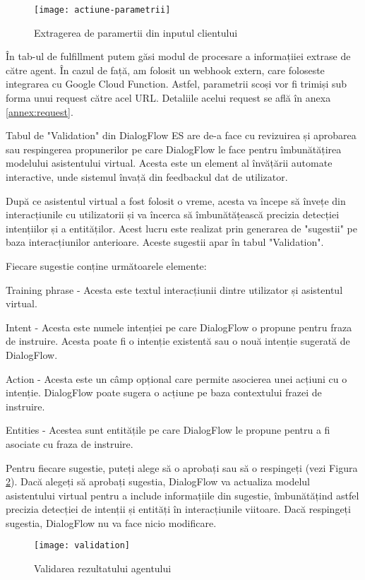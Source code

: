 \begin{figure}[h]
    \centering
    \texttt{[image: actiune-parametrii]}
    \caption{Extragerea de paramertii din inputul clientului}
    \label{fig:actiune-parametrii}
\end{figure}

În tab-ul de fulfillment putem găsi modul de procesare a informațiiei extrase de către agent. În cazul de față, am folosit un webhook extern, care foloseste integrarea cu Google Cloud Function. Astfel, parametrii scoși vor fi trimiși sub forma unui request către acel URL. Detaliile acelui request se află în anexa \ref{annex:request}.

Tabul de "Validation" din DialogFlow ES are de-a face cu revizuirea și aprobarea sau respingerea propunerilor pe care DialogFlow le face pentru îmbunătățirea modelului asistentului virtual. Acesta este un element al învățării automate interactive, unde sistemul învață din feedbackul dat de utilizator.

După ce asistentul virtual a fost folosit o vreme, acesta va începe să învețe din interacțiunile cu utilizatorii și va încerca să îmbunătățească precizia detecției intențiilor și a entităților. Acest lucru este realizat prin generarea de "sugestii" pe baza interacțiunilor anterioare. Aceste sugestii apar în tabul "Validation".

Fiecare sugestie conține următoarele elemente:

Training phrase - Acesta este textul interacțiunii dintre utilizator și asistentul virtual.

Intent - Acesta este numele intenției pe care DialogFlow o propune pentru fraza de instruire. Acesta poate fi o intenție existentă sau o nouă intenție sugerată de DialogFlow.

Action - Acesta este un câmp opțional care permite asocierea unei acțiuni cu o intenție. DialogFlow poate sugera o acțiune pe baza contextului frazei de instruire.

Entities - Acestea sunt entitățile pe care DialogFlow le propune pentru a fi asociate cu fraza de instruire.

Pentru fiecare sugestie, puteți alege să o aprobați sau să o respingeți (vezi Figura \ref{fig:validation}). Dacă alegeți să aprobați sugestia, DialogFlow va actualiza modelul asistentului virtual pentru a include informațiile din sugestie, îmbunătățind astfel precizia detecției de intenții și entități în interacțiunile viitoare. Dacă respingeți sugestia, DialogFlow nu va face nicio modificare.

\begin{figure}[h]
    \centering
    \texttt{[image: validation]}
    \caption{Validarea rezultatului agentului}
    \label{fig:validation}
\end{figure}
